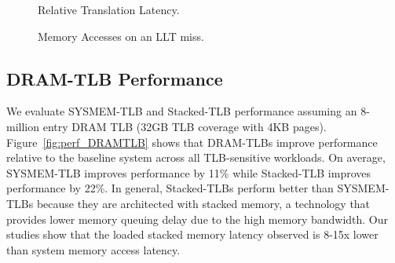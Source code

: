 \begin{figure}[tp] 
  \vspace{0.in} \centering
  \centerline{}

  \caption{\small Relative Translation Latency.\normalsize}
  \label{fig:tlblat_DRAMTLB} 
\end{figure}

\begin{figure}[b] 
  \vspace{0.2in} \centering
  \centerline{}

  \caption{\small Memory Accesses on an LLT miss.\normalsize}
 \label{fig:memaccess_DRAMTLB} 
  \vspace{0.0 in}
\end{figure}

\subsection{DRAM-TLB Performance}





\noindent We evaluate SYSMEM-TLB and Stacked-TLB performance assuming
an 8-million entry DRAM TLB (32GB TLB coverage with 4KB pages).
Figure~\ref{fig:perf_DRAMTLB} shows that DRAM-TLBs improve performance
relative to the baseline system across all TLB-sensitive workloads. On
average, SYSMEM-TLB improves performance by 11\% while Stacked-TLB
improves performance by 22\%. In general, Stacked-TLBs perform better
than SYSMEM-TLBs because they are architected with stacked memory, a
technology that provides lower memory queuing delay due to the high
memory bandwidth. Our studies show that the loaded stacked memory
latency observed is 8-15x lower than system memory access latency.

